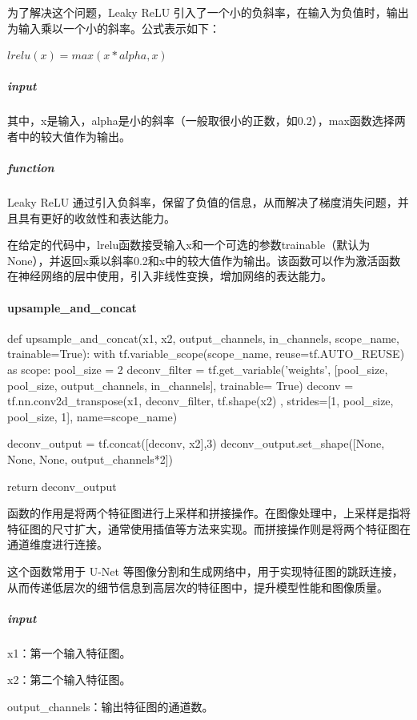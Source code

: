 \documentclass[letterpaper,12pt]{article}
\begin{document}
		为了解决这个问题，Leaky ReLU 引入了一个小的负斜率，在输入为负值时，输出为输入乘以一个小的斜率。公式表示如下：
		
		$ lrelu(x) = max(x * alpha, x) $
		
		\subparagraph{input}
		
		其中，x是输入，alpha是小的斜率（一般取很小的正数，如0.2），max函数选择两者中的较大值作为输出。
		
		\subparagraph{function}
		
		Leaky ReLU 通过引入负斜率，保留了负值的信息，从而解决了梯度消失问题，并且具有更好的收敛性和表达能力。
		
		在给定的代码中，lrelu函数接受输入x和一个可选的参数trainable（默认为None），并返回x乘以斜率0.2和x中的较大值作为输出。该函数可以作为激活函数在神经网络的层中使用，引入非线性变换，增加网络的表达能力。
		
		\paragraph{upsample\_and\_concat}
		
		\begin{python}
			def upsample_and_concat(x1, x2, output_channels, in_channels, scope_name, trainable=True):
			with tf.variable_scope(scope_name, reuse=tf.AUTO_REUSE) as scope:
			pool_size = 2
			deconv_filter = tf.get_variable('weights', [pool_size, pool_size, output_channels, in_channels], trainable= True)
			deconv = tf.nn.conv2d_transpose(x1, deconv_filter, tf.shape(x2) , strides=[1, pool_size, pool_size, 1], name=scope_name)
			
			deconv_output =  tf.concat([deconv, x2],3)
			deconv_output.set_shape([None, None, None, output_channels*2])
			
			return deconv_output
		\end{python}
		
		函数的作用是将两个特征图进行上采样和拼接操作。在图像处理中，上采样是指将特征图的尺寸扩大，通常使用插值等方法来实现。而拼接操作则是将两个特征图在通道维度进行连接。
		
		这个函数常用于 U-Net 等图像分割和生成网络中，用于实现特征图的跳跃连接，从而传递低层次的细节信息到高层次的特征图中，提升模型性能和图像质量。
		
		\subparagraph{input} 
		
			x1：第一个输入特征图。
			
			x2：第二个输入特征图。
			
			output\_channels：输出特征图的通道数。
			
\end{document}
